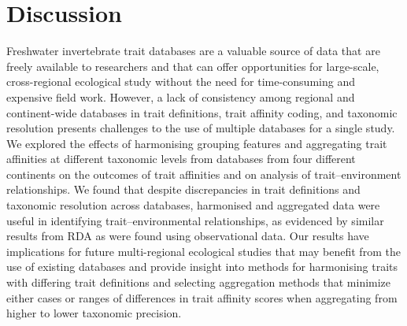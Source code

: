 \documentclass{article}
\begin{document}
\clearpage %
\label{fig:boxplots_scores_on_constrained_axis}

\newpage


\section*{Discussion}




Freshwater invertebrate trait databases are a valuable source of data that are freely available to researchers and that can offer opportunities for large-scale, cross-regional ecological study without the need for time-consuming and expensive field work. However, a lack of consistency among regional and continent-wide databases in trait definitions, trait affinity coding, and taxonomic resolution presents challenges to the use of multiple databases for a single study. We explored the effects of harmonising grouping features and aggregating trait affinities at different taxonomic levels from databases from four different continents on the outcomes of trait affinities and on analysis of trait–environment relationships. We found that despite discrepancies in trait definitions and taxonomic resolution across databases, harmonised and aggregated data were useful in identifying trait–environmental relationships, as evidenced by similar results from RDA as were found using observational data. Our results have implications for future multi-regional ecological studies that may benefit from the use of existing databases and provide insight into methods for harmonising traits with differing trait definitions and selecting aggregation methods that minimize either cases or ranges of differences in trait affinity scores when aggregating from higher to lower taxonomic precision.
\end{document}
